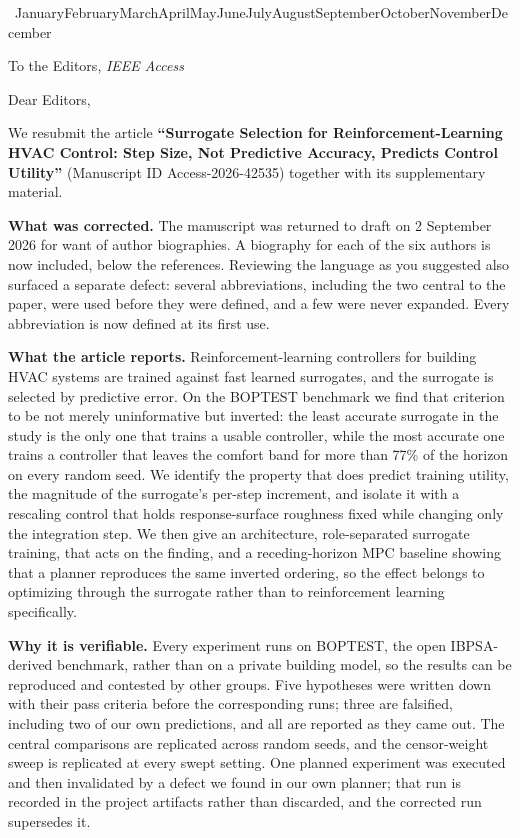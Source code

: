 \documentclass[11pt,a4paper]{article}
\renewcommand{\today}{\number\day\ \ifcase\month\or January\or February\or March\or April\or May\or June\or July\or August\or September\or October\or November\or December\fi\ \number\year}
\begin{document}
{\raggedleft \today\par}

\vspace{4pt}
To the Editors, \emph{IEEE Access}

\vspace{6pt}
Dear Editors,

We resubmit the article \textbf{``Surrogate Selection for
Reinforcement-Learning HVAC Control: Step Size, Not Predictive Accuracy,
Predicts Control Utility''} (Manuscript ID Access-2026-42535) together with its
supplementary material.

\textbf{What was corrected.} The manuscript was returned to draft on 2 September
2026 for want of author biographies. A biography for each of the six authors is
now included, below the references. Reviewing the language as you suggested also
surfaced a separate defect: several abbreviations, including the two central to
the paper, were used before they were defined, and a few were never expanded.
Every abbreviation is now defined at its first use.

\textbf{What the article reports.} Reinforcement-learning controllers for
building HVAC systems are trained against fast learned surrogates, and the
surrogate is selected by predictive error. On the BOPTEST benchmark we find that
criterion to be not merely uninformative but inverted: the least accurate
surrogate in the study is the only one that trains a usable controller, while the
most accurate one trains a controller that leaves the comfort band for more than
77\% of the horizon on every random seed. We identify the property that does
predict training utility, the magnitude of the surrogate's per-step increment,
and isolate it with a rescaling control that holds response-surface roughness
fixed while changing only the integration step. We then give an architecture,
role-separated surrogate training, that acts on the finding, and a
receding-horizon MPC baseline showing that a planner reproduces the same inverted
ordering, so the effect belongs to optimizing through the surrogate rather than
to reinforcement learning specifically.

\textbf{Why it is verifiable.} Every experiment runs on BOPTEST, the open
IBPSA-derived benchmark, rather than on a private building model, so the results
can be reproduced and contested by other groups. Five hypotheses were written
down with their pass criteria before the corresponding runs; three are falsified,
including two of our own predictions, and all are reported as they came out. The
central comparisons are replicated across random seeds, and the censor-weight
sweep is replicated at every swept setting. One planned experiment was executed
and then invalidated by a defect we found in our own planner; that run is
recorded in the project artifacts rather than discarded, and the corrected run
supersedes it.
\end{document}
